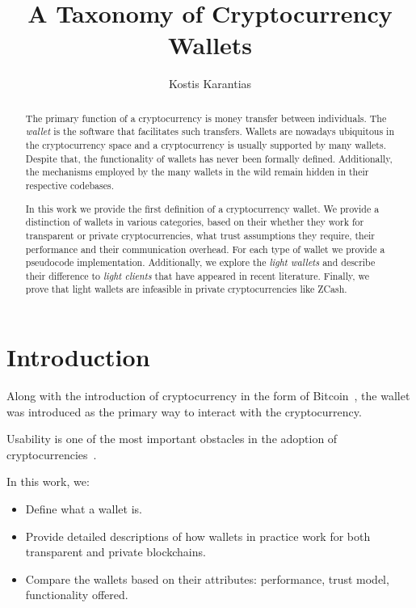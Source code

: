 \documentclass[sigconf]{acmart}
\begin{document}
\title{A Taxonomy of Cryptocurrency Wallets}

\author{Kostis Karantias}

\renewcommand{\shortauthors}{Karantias}

\begin{abstract}
    The primary function of a cryptocurrency is money transfer between individuals. The \emph{wallet} is the software that facilitates such transfers. Wallets are nowadays ubiquitous in the cryptocurrency space and a cryptocurrency is usually supported by many wallets. Despite that, the functionality of wallets has never been formally defined. Additionally, the mechanisms employed by the many wallets in the wild remain hidden in their respective codebases.
    
    In this work we provide the first definition of a cryptocurrency wallet. We provide a distinction of wallets in various categories, based on their whether they work for transparent or private cryptocurrencies, what trust assumptions they require, their performance and their communication overhead. For each type of wallet we provide a pseudocode implementation. Additionally, we explore the \emph{light wallets} and describe their difference to \emph{light clients} that have appeared in recent literature. Finally, we prove that light wallets are infeasible in private cryptocurrencies like ZCash.
\end{abstract}

\maketitle

\section{Introduction}
Along with the introduction of cryptocurrency in the form of Bitcoin~\cite{bitcoin}, the wallet was introduced as the primary way to interact with the cryptocurrency.

Usability is one of the most important obstacles in the adoption of cryptocurrencies~\cite{meiklejohn2018top}.

In this work, we:
\begin{itemize}
    \item Define what a wallet is.
    \item Provide detailed descriptions of how wallets in practice work for both transparent and private blockchains.
    \item Compare the wallets based on their attributes: performance, trust model, functionality offered.
\end{itemize}
\end{document}
